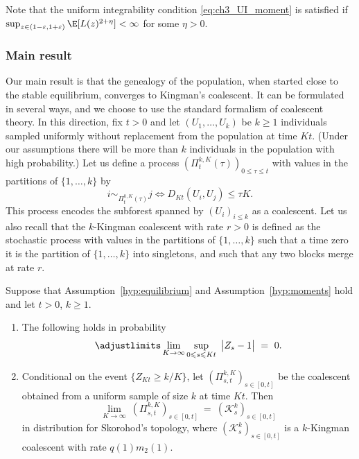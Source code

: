 \begin{refsegment}
Note that the uniform integrability condition \eqref{eq:ch3_UI_moment} is
satisfied if $\sup_{z \in (1-\varepsilon, 1+\varepsilon)} \E[L(z)^{2+\eta}] <
\infty$ for some $\eta > 0$.


\subsubsection*{Main result} Our main result is that the genealogy of the
population, when started close to the stable equilibrium, converges to
Kingman's coalescent. It can be formulated in several ways, and we choose
to use the standard formalism of coalescent theory. In this
direction, fix $t > 0$ and let $(U_1,\ldots, U_k)$ be $k\geqslant 1$ individuals
sampled uniformly without replacement from the population at time $Kt$.
(Under our assumptions there will be more than $k$ individuals in the
population with high probability.) Let us define a process
$(\Pi^{k,K}_t(\tau))_{0 \leqslant \tau \leqslant t}$ with values in the partitions of
$\{1,\ldots, k\}$ by
\[
    i \sim_{\Pi^{k,K}_t(\tau)} j \iff D_{Kt}(U_i, U_j) \leqslant \tau K.
\]
This process encodes the subforest spanned by $(U_i)_{i \leqslant k}$ as a
coalescent. Let us also recall that the $k$-Kingman coalescent with
rate $r > 0$ is defined as the stochastic process with values in the partitions of $\{1,\ldots,k\}$ such that
a time zero it is the partition of $\{1,\ldots,k\}$ into singletons, and
such that any two blocks merge at rate $r$.

\begin{thm}\label{thm:main}
    Suppose that Assumption~\ref{hyp:equilibrium} and Assumption~\ref{hyp:moments}
    hold and let $t > 0$, $k\geqslant 1$.
    \begin{enumerate}
    \item[(i)] The following holds in probability
        \[
            \adjustlimits\lim_{K \to \infty} \sup_{0 \leqslant s \leqslant Kt}\ 
            \big| Z_s - 1 \big|\ =\ 0.
        \]
    \item[(ii)] Conditional on the event $\{Z_{Kt}\geqslant k/K\}$, let
        $(\Pi^{k,K}_{s,t})_{s\in [0,t]}$ be the coalescent obtained from
        a uniform sample of size $k$ at time $Kt$. Then
    \[
        \lim_{K \to \infty}\ (\Pi^{k,K}_{s,t})_{s\in [0,t]}\ =\ (\mathcal{K}^{k}_s)_{s
    \in [0,t]}
    \]
    in distribution for Skorohod's topology, where $(\mathcal{K}^{k}_s)_{s
    \in [0,t]}$ is a $k$-Kingman coalescent with rate $q(1)m_2(1)$. 
    \end{enumerate}
\end{thm}


\end{refsegment}
